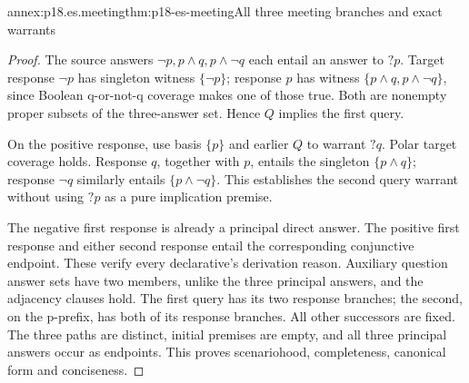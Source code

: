 \begin{annexitem}{annex:p18.es.meeting}{thm:p18-es-meeting}{All three meeting branches and exact warrants}
\begin{proof}
The source answers \(\neg p,p\land q,p\land\neg q\) each entail an
answer to \(?p\). Target response \(\neg p\) has singleton witness
\(\{\neg p\}\); response \(p\) has witness
\(\{p\land q,p\land\neg q\}\), since Boolean q-or-not-q coverage
makes one of those true. Both are nonempty proper subsets of the three-answer
set. Hence \(Q\) implies the first query.

On the positive response, use basis \(\{p\}\) and earlier \(Q\) to
warrant \(?q\). Polar target coverage holds. Response \(q\), together
with \(p\), entails the singleton \(\{p\land q\}\); response
\(\neg q\) similarly entails \(\{p\land\neg q\}\). This establishes
the second query warrant without using \(?p\) as a pure implication premise.

The negative first response is already a principal direct answer. The positive
first response and either second response entail the corresponding conjunctive
endpoint. These verify every declarative's derivation reason. Auxiliary
question answer sets have two members, unlike the three principal answers,
and the adjacency clauses hold. The first query has its two response branches;
the second, on the p-prefix, has both of its response branches. All other
successors are fixed. The three paths are distinct, initial premises are
empty, and all three principal answers occur as endpoints. This proves
scenariohood, completeness, canonical form and conciseness.
\end{proof}
\end{annexitem}

